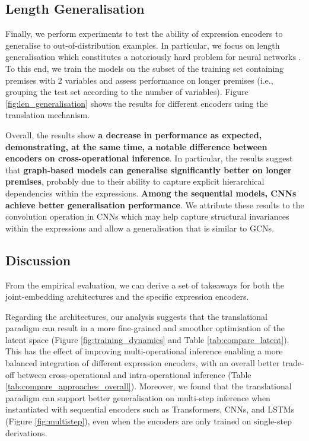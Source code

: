 \documentclass[11pt]{article}
\begin{document}
\subsection{Length Generalisation}

Finally, we perform experiments to test the ability of expression encoders to generalise to out-of-distribution examples. In particular, we focus on length generalisation which constitutes a notoriously hard problem for neural networks \cite{shen2021towards,hupkes2020compositionality,geirhos2020shortcut}. To this end, we train the models on the subset of the training set containing premises with 2 variables and assess performance on longer premises (i.e., grouping the test set according to the number of variables). Figure \ref{fig:len_generalisation} shows the results for different encoders using the translation mechanism.

Overall, the results show \textbf{a decrease in performance as expected, demonstrating, at the same time, a notable difference between encoders on cross-operational inference}. In particular, the results suggest that \textbf{graph-based models can generalise significantly better on longer premises}, probably due to their ability to capture explicit hierarchical dependencies within the expressions. \textbf{Among the sequential models, CNNs achieve better generalisation performance}. We attribute these results to the convolution operation in CNNs which may help capture structural invariances within the expressions and allow a generalisation that is similar to GCNs.

\subsection{Discussion}

From the empirical evaluation, we can derive a set of takeaways for both the joint-embedding architectures and the specific expression encoders.

Regarding the architectures, our analysis suggests that the translational paradigm can result in a more fine-grained and smoother optimisation of the latent space (Figure \ref{fig:training_dynamics} and Table \ref{tab:compare_latent}). This has the effect of improving multi-operational inference enabling a more balanced integration of different expression encoders, with an overall better trade-off between cross-operational and intra-operational inference (Table \ref{tab:compare_approaches_overall}). Moreover, we found that the translational paradigm can support better generalisation on multi-step inference when instantiated with sequential encoders such as Transformers, CNNs, and LSTMs (Figure \ref{fig:multistep}), even when the encoders are only trained on single-step derivations.
\end{document}
